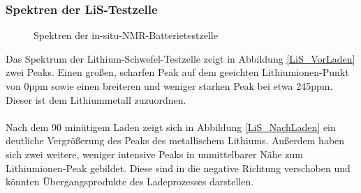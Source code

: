 \documentclass[a4paper, 11pt, headsepline,footsepline,twoside,abstract]{scrbook}
\begin{document}
\subsubsection{Spektren der LiS-Testzelle}
\begin{figure}
   \centering
       \vspace{10mm}
       \vspace{6mm}
	\caption{Spektren der in-situ-NMR-Batterietestzelle}
   	\label{insitu_nmr}
\end{figure}  
Das Spektrum der Lithium-Schwefel-Testzelle zeigt in Abbildung \ref{LiS_VorLaden} zwei Peaks. Einen großen, scharfen Peak auf dem geeichten Lithiumionen-Punkt von 0\;ppm sowie einen breiteren und weniger starken Peak bei etwa 245\;ppm. Dieser ist dem Lithiummetall zuzuordnen.
\\\\
Nach dem 90 minütigem Laden zeigt sich in Abbildung \ref{LiS_NachLaden} ein deutliche Vergrößerung des Peaks des metallischem Lithiums. Außerdem haben sich zwei weitere, weniger intensive Peaks in unmittelbarer Nähe zum Lithiumionen-Peak gebildet. Diese sind in die negative Richtung verschoben und könnten Übergangsprodukte des Ladeprozesses darstellen.
\end{document}
